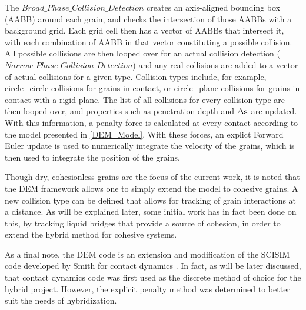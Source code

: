 The $Broad\_Phase\_Collision\_Detection$ creates an axis-aligned bounding box (AABB) around each grain, and checks the intersection of those AABBs with a background grid. Each grid cell then has a vector of AABBs that intersect it, with each combination of AABB in that vector constituting a possible collision. All possible collisions are then looped over for an actual collision detection ($Narrow\_Phase\_Collision\_Detection$) and any real collisions are added to a vector of actual collisions for a given type. Collision types include, for example, circle\_circle collisions for grains in contact, or circle\_plane collisions for grains in contact with a rigid plane. The list of all collisions for every collision type are then looped over, and properties such as penetration depth and $\Delta\bold{s}$ are updated. With this information, a penalty force is calculated at every contact according to the model presented in \ref{DEM_Model}. With these forces, an explict Forward Euler update is used to numerically integrate the velocity of the grains, which is then used to integrate the position of the grains.

Though dry, cohesionless grains are the focus of the current work, it is noted that the DEM framework allows one to simply extend the model to cohesive grains. A new collision type can be defined that allows for tracking of grain interactions at a distance. As will be explained later, some initial work has in fact been done on this, by tracking liquid bridges that provide a source of cohesion, in order to extend the hybrid method for cohesive systems.

As a final note, the DEM code is an extension and modification of the SCISIM code developed by Smith for contact dynamics \cite{Smith:2012}. In fact, as will be later discussed, that contact dynamics code was first used as the discrete method of choice for the hybrid project. However, the explicit penalty method was determined to better suit the needs of hybridization.